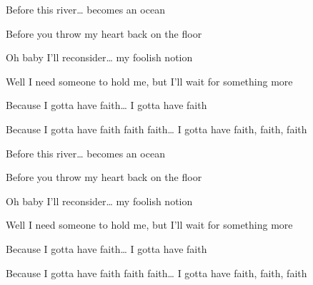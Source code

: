 \begin{song}
\bigskip

Before this river… becomes an ocean \par
Before you throw my heart back on the floor \par
Oh baby I’ll reconsider… my foolish notion \par
Well I need someone to hold me, but I’ll wait for something more \par

\bigskip

Because I gotta have faith… I gotta have faith \par
Because I gotta have faith faith faith… I gotta have faith, faith, faith \par

\bigskip

Before this river… becomes an ocean \par
Before you throw my heart back on the floor \par
Oh baby I’ll reconsider… my foolish notion \par
Well I need someone to hold me, but I’ll wait for something more \par

\bigskip

Because I gotta have faith… I gotta have faith \par
Because I gotta have faith faith faith… I gotta have faith, faith, faith \par

\end{song}
